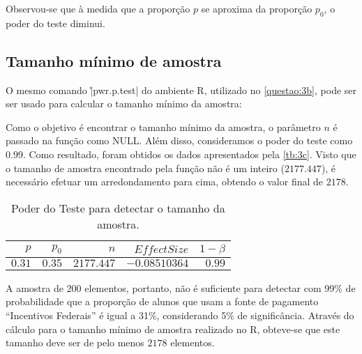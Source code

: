 Observou-se que à medida que a proporção $p$ se aproxima da proporção $p_0$, o poder do teste diminui.


\subsection{Tamanho mínimo de amostra}
\label{questao:3c}
O mesmo comando \r|pwr.p.test| do ambiente R, utilizado no \autoref{questao:3b}, pode ser ser usado para calcular o tamanho mínimo da amostra: 


Como o objetivo é encontrar o tamanho mínimo da amostra, o parâmetro $n$ é passado na função como NULL. Além disso, consideramos o poder do teste como $0.99$.
Como resultado, foram obtidos os dados apresentados pela \autoref{tb:3c}. 
Visto que o tamanho de amostra encontrado pela função não é um inteiro ($2177.447$), é necessário efetuar um arredondamento para cima, obtendo o valor final de $2178$.

\begin{table}[ht]
\centering
\caption{Poder do Teste para detectar o tamanho da amostra.} 
\label{tb:3c}
\begin{tabular}{rrrrr}
  \toprule
 $p$ & $p_0$ & $n$ & $Effect Size$ & $1 - \beta$ \\ 
  \midrule
  $0.31$ & $0.35$ & $2177.447$ & $-0.08510364$ & $0.99$ \\ 
   \bottomrule
\end{tabular}
\end{table}

A amostra de $200$ elementos, portanto, não é suficiente para detectar com 99\% de probabilidade que a proporção
de alunos que usam a fonte de pagamento ``Incentivos Federais'' é igual a 31\%, considerando 5\% de significância.
Através do cálculo para o tamanho mínimo de amostra realizado no R, 
obteve-se que este tamanho deve ser de pelo menos $2178$ elementos.

